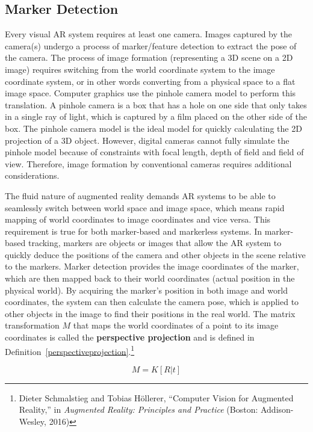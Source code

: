 \subsection{Marker Detection}
Every visual AR system requires at least one camera. Images captured by the camera(s) undergo a process of marker/feature detection to extract the pose of the camera. The process of image formation (representing a 3D scene on a 2D image) requires switching from the world coordinate system to the image coordinate system, or in other words converting from a physical space to a flat image space. Computer graphics use the pinhole camera model to perform this translation. A pinhole camera is a box that has a hole on one side that only takes in a single ray of light, which is captured by a film placed on the other side of the box. The pinhole camera model is the ideal model for quickly calculating the 2D projection of a 3D object. However, digital cameras cannot fully simulate the pinhole model because of constraints with focal length, depth of field and field of view. Therefore, image formation by conventional cameras requires additional considerations.

The fluid nature of augmented reality demands AR systems to be able to seamlessly switch between world space and image space, which means rapid mapping of world coordinates to image coordinates and vice versa. This requirement is true for both marker-based and markerless systems. In marker-based tracking, markers are objects or images that allow the AR system to quickly deduce the positions of the camera and other objects in the scene relative to the markers. Marker detection provides the image coordinates of the marker, which are then mapped back to their world coordinates (actual position in the physical world). By acquiring the marker’s position in both image and world coordinates, the system can then calculate the camera pose, which is applied to other objects in the image to find their positions in the real world. The matrix transformation $M$ that maps the world coordinates of a point to its image coordinates is called the \textbf{perspective projection} and is defined in Definition~\ref{perspectiveprojection}.\footnote{Dieter Schmalstieg and Tobias Höllerer, “Computer Vision for Augmented Reality,” in \textit{Augmented Reality: Principles and Practice} (Boston: Addison-Wesley, 2016)}

\begin{defn}\label{perspectiveprojection}
\begin{equation}
M = K [R | t]
\end{equation} \end{defn}


